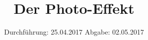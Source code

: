


\subject{V500}
\title{Der Photo-Effekt}
\date{
	Durchführung: 25.04.2017
	\hspace{4em}
	Abgabe: 02.05.2017
}


	\maketitle
	\newpage
	\tableofcontents
	\newpage
	
	
	
	
	
	
	\newpage
	
	\printbibliography

